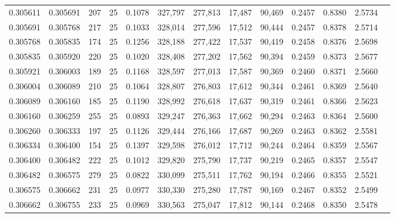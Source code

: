 \begin{tabular}{rrrrrrrrrrrrr}
0.305611 & 0.305691 &   207 &  25 &                                     0.1078 & 327,797 & 277,813 &  17,487 &  90,469 & 0.2457 & 0.8380 & 2.5734 \\
0.305691 & 0.305768 &   217 &  25 &                                     0.1033 & 328,014 & 277,596 &  17,512 &  90,444 & 0.2457 & 0.8378 & 2.5714 \\
0.305768 & 0.305835 &   174 &  25 &                                     0.1256 & 328,188 & 277,422 &  17,537 &  90,419 & 0.2458 & 0.8376 & 2.5698 \\
0.305835 & 0.305920 &   220 &  25 &                                     0.1020 & 328,408 & 277,202 &  17,562 &  90,394 & 0.2459 & 0.8373 & 2.5677 \\
0.305921 & 0.306003 &   189 &  25 &                                     0.1168 & 328,597 & 277,013 &  17,587 &  90,369 & 0.2460 & 0.8371 & 2.5660 \\
0.306004 & 0.306089 &   210 &  25 &                                     0.1064 & 328,807 & 276,803 &  17,612 &  90,344 & 0.2461 & 0.8369 & 2.5640 \\
0.306089 & 0.306160 &   185 &  25 &                                     0.1190 & 328,992 & 276,618 &  17,637 &  90,319 & 0.2461 & 0.8366 & 2.5623 \\
0.306160 & 0.306259 &   255 &  25 &                                     0.0893 & 329,247 & 276,363 &  17,662 &  90,294 & 0.2463 & 0.8364 & 2.5600 \\
0.306260 & 0.306333 &   197 &  25 &                                     0.1126 & 329,444 & 276,166 &  17,687 &  90,269 & 0.2463 & 0.8362 & 2.5581 \\
0.306334 & 0.306400 &   154 &  25 &                                     0.1397 & 329,598 & 276,012 &  17,712 &  90,244 & 0.2464 & 0.8359 & 2.5567 \\
0.306400 & 0.306482 &   222 &  25 &                                     0.1012 & 329,820 & 275,790 &  17,737 &  90,219 & 0.2465 & 0.8357 & 2.5547 \\
0.306482 & 0.306575 &   279 &  25 &                                     0.0822 & 330,099 & 275,511 &  17,762 &  90,194 & 0.2466 & 0.8355 & 2.5521 \\
0.306575 & 0.306662 &   231 &  25 &                                     0.0977 & 330,330 & 275,280 &  17,787 &  90,169 & 0.2467 & 0.8352 & 2.5499 \\
0.306662 & 0.306755 &   233 &  25 &                                     0.0969 & 330,563 & 275,047 &  17,812 &  90,144 & 0.2468 & 0.8350 & 2.5478 \\

\end{tabular}
